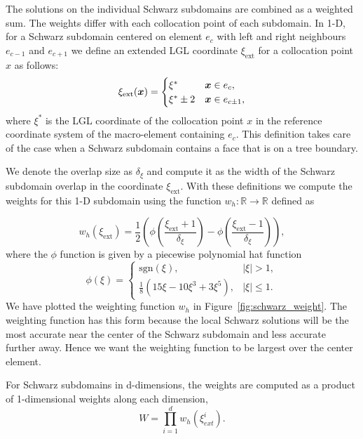 The solutions on the individual Schwarz subdomains are
  combined as a weighted sum.  The weights differ with each
  collocation point of each subdomain. In 1-D, for a Schwarz
  subdomain centered on element $e_c$ with left and right neighbours
  $e_{c-1}$ and $e_{c+1}$ we define an extended LGL coordinate $\xi_{\text{ext}}$
  for a collocation point $x$ as follows:
%
  \begin{equation}
\xi_{\text{ext}}(\boldsymbol{x}) = \begin{cases} 
      \xi^* & \boldsymbol{x} \in e_c, \\
      \xi^* \pm 2 & \boldsymbol{x} \in e_{c\pm1},
\end{cases}
  \end{equation}
where $\xi^*$ is the LGL coordinate of the collocation point $x$ in the reference coordinate system of the macro-element containing $e_c$. This definition takes care of the case when a Schwarz subdomain contains a face that is on a tree boundary.
  
  We denote the overlap size as $\delta_\xi$ and compute it as the width
  of the Schwarz subdomain overlap in the coordinate $\xi_{\text{ext}}$. With
  these definitions we compute the weights for this 1-D subdomain using
  the function $w_h:\mathbb{R}\to\mathbb{R}$ defined as
  
\begin{equation}
  \label{eqn:schwarz_weight}
  w_h(\xi_{\text{ext}}) = \frac{1}{2}\left(\phi\left(\frac{\xi_{\text{ext}}+1}{\delta_\xi}\right) - \phi\left(\frac{\xi_{\text{ext}}-1}{\delta_\xi}\right)\right),
\end{equation}
%
where the $\phi$ function is given by a piecewise polynomial hat function
%
\begin{equation}
\phi(\xi) = \begin{cases} 
      \text{sgn}(\xi), & |\xi| > 1, \\
      \frac{1}{8}(15\xi - 10\xi^3 + 3\xi^5), & |\xi| \leq 1.
   \end{cases}
\end{equation}
We have plotted the weighting function $w_h$ in
Figure~\ref{fig:schwarz_weight}. The weighting function has this form because the local Schwarz solutions will be the most accurate near the center of the Schwarz subdomain and less accurate further away. Hence we want the weighting function to be largest over the center element.

For Schwarz subdomains in d-dimensions, the weights are computed
as a product of 1-dimensional weights along each dimension,
%
\begin{equation}
  W = \prod_{i=1}^{d} w_h(\xi^i_{ext}).
\end{equation}

